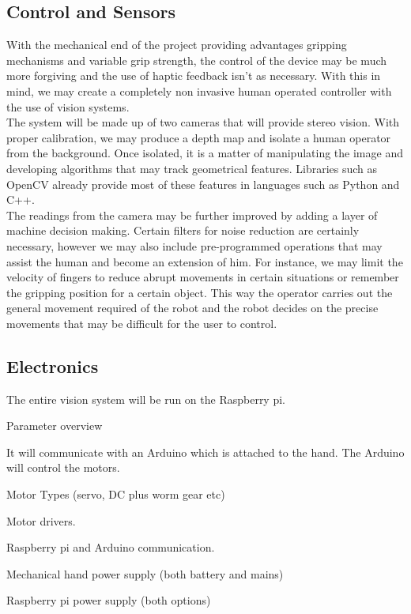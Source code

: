 \documentclass{article}
\begin{document}
\subsection{Control and Sensors}

With the mechanical end of the project providing advantages gripping mechanisms and variable grip strength, the control of the device may be much more forgiving and the use of haptic feedback isn't as necessary. With this in mind, we may create a completely non invasive human operated controller with the use of vision systems. \\[12pt]
\indent The system will be made up of two cameras that will provide stereo vision. With proper calibration, we may produce a depth map and isolate a human operator from the background. Once isolated, it is a matter of manipulating the image and developing algorithms that may track geometrical features. Libraries such as OpenCV already provide most of these features in languages such as Python and C++. \\[12pt]
\indent The readings from the camera may be further improved by adding a layer of machine decision making. Certain filters for noise reduction are certainly necessary, however we may also include pre-programmed operations that may assist the human and become an extension of him. For instance, we may limit the velocity of fingers to reduce abrupt movements in certain situations or remember the gripping position for a certain object. This way the operator carries out the general movement required of the robot and the robot decides on the precise movements that may be difficult for the user to control. 

\subsection{Electronics}

The entire vision system will be run on the Raspberry pi.

Parameter overview

It will communicate with an Arduino which is attached to the hand. The Arduino will control the motors.

Motor Types (servo, DC plus worm gear etc) 

Motor drivers.

Raspberry pi and Arduino communication.

Mechanical hand power supply (both battery and mains)

Raspberry pi power supply (both options)
\end{document}
